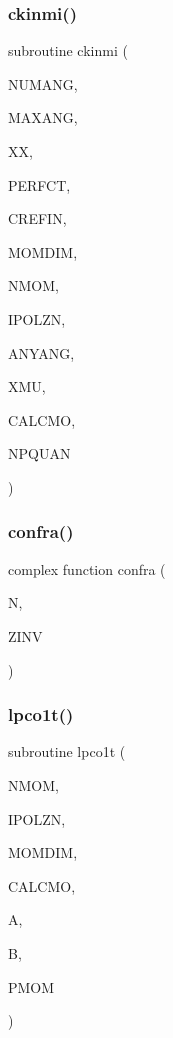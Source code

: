 \subsubsection{\texorpdfstring{ckinmi()}{ckinmi()}}
{\footnotesize\ttfamily subroutine ckinmi (\begin{DoxyParamCaption}\item[{integer}]{N\+U\+M\+A\+NG,  }\item[{integer}]{M\+A\+X\+A\+NG,  }\item[{real}]{XX,  }\item[{logical}]{P\+E\+R\+F\+CT,  }\item[{complex}]{C\+R\+E\+F\+IN,  }\item[{integer}]{M\+O\+M\+D\+IM,  }\item[{integer}]{N\+M\+OM,  }\item[{integer}]{I\+P\+O\+L\+ZN,  }\item[{logical}]{A\+N\+Y\+A\+NG,  }\item[{real, dimension( $\ast$ )}]{X\+MU,  }\item[{logical, dimension( $\ast$ )}]{C\+A\+L\+C\+MO,  }\item[{integer}]{N\+P\+Q\+U\+AN }\end{DoxyParamCaption})}

\mbox{\label{miev0__py_8f_ad91aace4d77229d367c28c78965a0bd5}} 
\subsubsection{\texorpdfstring{confra()}{confra()}}
{\footnotesize\ttfamily complex function confra (\begin{DoxyParamCaption}\item[{integer}]{N,  }\item[{complex}]{Z\+I\+NV }\end{DoxyParamCaption})}

\mbox{\label{miev0__py_8f_a6fcb83505689f74c82cf122a250675b6}} 
\subsubsection{\texorpdfstring{lpco1t()}{lpco1t()}}
{\footnotesize\ttfamily subroutine lpco1t (\begin{DoxyParamCaption}\item[{integer}]{N\+M\+OM,  }\item[{integer}]{I\+P\+O\+L\+ZN,  }\item[{integer}]{M\+O\+M\+D\+IM,  }\item[{logical, dimension( $\ast$ )}]{C\+A\+L\+C\+MO,  }\item[{complex, dimension( $\ast$ )}]{A,  }\item[{complex, dimension( $\ast$ )}]{B,  }\item[{real, dimension( 0\+:momdim, $\ast$ )}]{P\+M\+OM }\end{DoxyParamCaption})}

